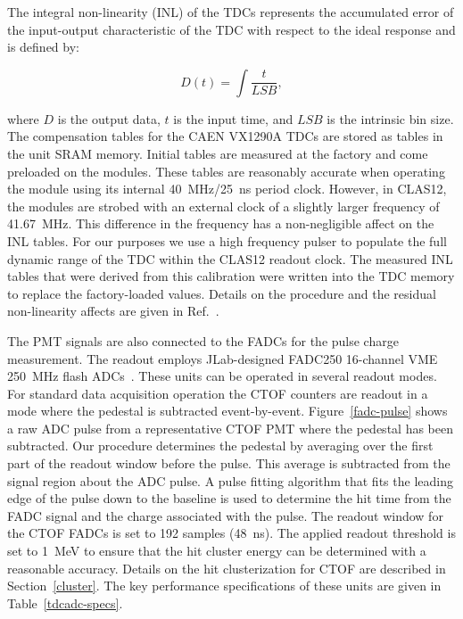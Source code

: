 \documentclass{elsart}
\begin{document}
The integral non-linearity (INL) of the TDCs represents the accumulated error of the input-output
characteristic of the TDC with respect to the ideal response and is defined by:

\begin{equation}
D(t) = \int \frac{t}{LSB},
\end{equation}

\noindent
where $D$ is the output data, $t$ is the input time, and $LSB$ is the intrinsic bin size. The compensation
tables for the CAEN VX1290A TDCs are stored as tables in the unit SRAM memory. Initial tables are
measured at the factory and come preloaded on the modules. These tables are reasonably accurate when
operating the module using its internal 40~MHz/25~ns period clock. However, in CLAS12, the modules are
strobed with an external clock of a slightly larger frequency of 41.67~MHz. This difference in the
frequency has a non-negligible affect on the INL tables. For our purposes we use a high frequency pulser
to populate the full dynamic range of the TDC within the CLAS12 readout clock. The measured INL tables
that were derived from this calibration were written into the TDC memory to replace the factory-loaded
values. Details on the procedure and the residual non-linearity affects are given in Ref.~\cite{inl-tables}.

The PMT signals are also connected to the FADCs for the pulse charge measurement. The readout
employs JLab-designed FADC250 16-channel VME 250~MHz flash ADCs~\cite{fadc-manual}. These units
can be operated in several readout modes. For standard data acquisition operation the CTOF counters are
readout in a mode where the pedestal is subtracted event-by-event. Figure~\ref{fadc-pulse} shows a raw
ADC pulse from a representative CTOF PMT where the pedestal has been subtracted. Our procedure
determines the pedestal by averaging over the first part of the readout window before the pulse. This
average is subtracted from the signal region about the ADC pulse. A pulse fitting algorithm that fits the
leading edge of the pulse down to the baseline is used to determine the hit time from the FADC signal and
the charge associated with the pulse. The readout window for the CTOF FADCs is set to 192 samples
(48~ns). The applied readout threshold is set to 1~MeV to ensure that the hit cluster energy can be
determined with a reasonable accuracy. Details on the hit clusterization for CTOF are described in
Section~\ref{cluster}. The key performance specifications of these units are given in Table~\ref{tdcadc-specs}.
\end{document}
